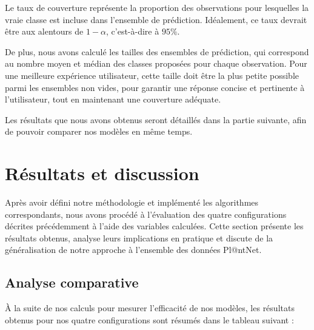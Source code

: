 \documentclass[a4paper,12pt]{article}
\begin{document}
\vspace{0.2cm}

Le taux de couverture représente la proportion des observations pour lesquelles la vraie classe est incluse dans l'ensemble de prédiction. Idéalement, ce taux devrait être aux alentours de $1- \alpha$, c'est-à-dire à $95\%$.

\vspace{0.2cm}

De plus, nous avons calculé les tailles des ensembles de prédiction, qui correspond au nombre moyen et médian des classes proposées pour chaque observation. Pour une meilleure expérience utilisateur, cette taille doit être la plus petite possible parmi les ensembles non vides, pour garantir une réponse concise et pertinente à l'utilisateur, tout en maintenant une couverture adéquate.

\vspace{0.2cm}

Les résultats que nous avons obtenus seront détaillés dans la partie suivante, afin de pouvoir comparer nos modèles en même temps.


\section{Résultats et discussion}

Après avoir défini notre méthodologie et implémenté les algorithmes correspondants, nous avons procédé à l'évaluation des quatre configurations décrites précédemment à l'aide des variables calculées. Cette section présente les résultats obtenus, analyse leurs implications en pratique et discute de la généralisation de notre approche à l'ensemble des données Pl@ntNet.


\subsection{Analyse comparative}

À la suite de nos calculs pour mesurer l'efficacité de nos modèles, les résultats obtenus pour nos quatre configurations sont résumés dans le tableau suivant :
\end{document}
